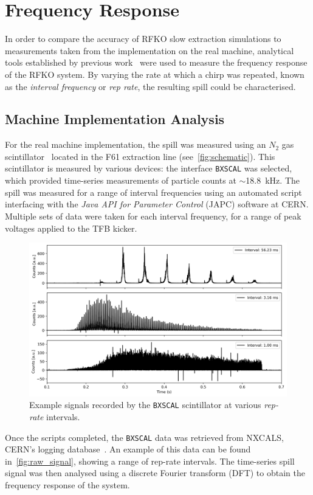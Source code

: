 \documentclass[11pt]{report}
\begin{document}
\section{Frequency Response}

In order to compare the accuracy of RFKO slow extraction simulations to measurements taken from the implementation on the real machine, analytical tools established by previous work~\cite{Pari:2780495} were used to measure the frequency response of the RFKO system. By varying the rate at which a chirp was repeated, known as the \textit{interval frequency} or \textit{rep rate}, the resulting spill could be characterised. 

\subsection{Machine Implementation Analysis}

For the real machine implementation, the spill was measured using an $N_2$ gas scintillator~\cite{Actis:bxscint} located in the F61 extraction line (see~\autoref{fig:schematic}). This scintillator is measured by various devices: the interface \verb|BXSCAL| was selected, which provided time-series measurements of particle counts at $\sim$\qty{18.8}{\kilo\hertz}. The spill was measured for a range of interval frequencies using an automated script interfacing with the \textit{Java API for Parameter Control} (JAPC) software at CERN. Multiple sets of data were taken for each interval frequency, for a range of peak voltages applied to the TFB kicker. 

\begin{figure}
  \centering
  \includegraphics*[width=0.7\linewidth]{raw_signal.png}
  \cprotect\caption{Example signals recorded by the \verb|BXSCAL| scintillator at various \textit{rep-rate} intervals.}\label{fig:raw_signal}
\end{figure}

Once the scripts completed, the \verb|BXSCAL| data was retrieved from NXCALS, CERN's logging database~\cite{nxcals}. An example of this data can be found in~\autoref{fig:raw_signal}, showing a range of rep-rate intervals. The time-series spill signal was then analysed using a discrete Fourier transform (DFT) to obtain the frequency response of the system. 
\end{document}
